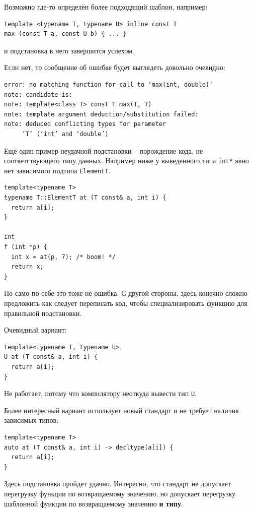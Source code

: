 \documentclass[a4paper,12pt,oneside]{article}
\begin{document}
Возможно где-то определён более подходящий шаблон, например:

\begin{lstlisting}
template <typename T, typename U> inline const T 
max (const T a, const U b) { ... }
\end{lstlisting}

и подстановка в него завершится успехом.

Если нет, то сообщение об ошибке будет выглядеть довольно очевидно:

\begin{verbatim}
error: no matching function for call to ‘max(int, double)’
note: candidate is:
note: template<class T> const T max(T, T)
note: template argument deduction/substitution failed:
note: deduced conflicting types for parameter 
     ‘T’ (‘int’ and ‘double’)
\end{verbatim}

Ещё один пример неудачной подстановки -- порождение кода, не соответствующего типу данных. Например ниже у выведенного типа \lstinline!int*! явно нет зависимого подтипа \lstinline!ElementT!.

\begin{lstlisting}
template<typename T>
typename T::ElementT at (T const& a, int i) {
  return a[i];
}

int
f (int *p) {
  int x = at(p, 7); /* boom! */
  return x;
}
\end{lstlisting}

Но само по себе это тоже не ошибка. С другой стороны, здесь конечно сложно предложить как следует переписать код, чтобы специализировать функцию для правильной подстановки. 

Очевидный вариант:

\begin{lstlisting}
template<typename T, typename U>
U at (T const& a, int i) {
  return a[i];
}
\end{lstlisting}

Не работает, потому что компилятору неоткуда вывести тип \lstinline!U!.

Более интересный вариант использует новый стандарт и не требует наличия зависимых типов:

\begin{lstlisting}
template<typename T>
auto at (T const& a, int i) -> decltype(a[i]) {
  return a[i];
}
\end{lstlisting}

Здесь подстановка пройдет удачно. Интересно, что стандарт не допускает перегрузку функции по возвращаемому значению, но допускает перегрузку шаблонной функции по возвращаемому значению \textbf{и типу}.
\end{document}

